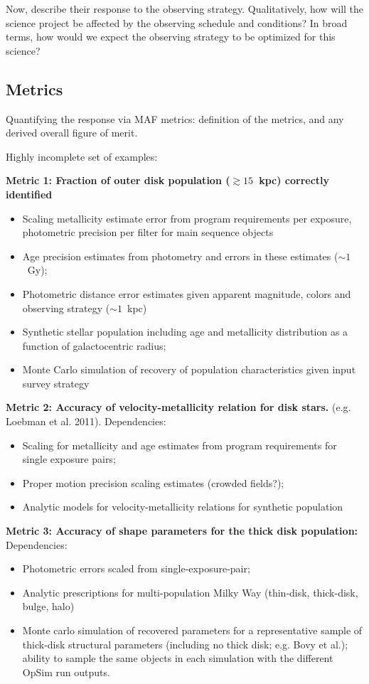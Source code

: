 Now, describe their response to the observing strategy. Qualitatively,
how will the science project be affected by the observing schedule and
conditions? In broad terms, how would we expect the observing strategy
to be optimized for this science?



\subsection{Metrics}
\label{sec:\secname:metrics}

Quantifying the response via MAF metrics: definition of the metrics,
and any derived overall figure of merit.

Highly incomplete set of examples:

{\bf Metric 1: Fraction of outer disk population ($\gtrsim 15$~kpc) correctly identified}
\begin{itemize}
  \item Scaling metallicity estimate error from program requirements per exposure, photometric precision per filter for main sequence objects
    \item Age precision estimates from photometry and errors in these estimates ($\sim 1$~Gy);
      \item Photometric distance error estimates given apparent magnitude, colors and observing strategy ($\sim 1$~kpc)
        \item Synthetic stellar population including age and metallicity distribution as a function of galactocentric radius;
          \item Monte Carlo simulation of recovery of population
            characteristics given input survey strategy
\end{itemize}

{\bf Metric 2: Accuracy of velocity-metallicity relation for disk stars.} (e.g. Loebman et al. 2011). Dependencies:
\begin{itemize}
  \item Scaling for metallicity and age estimates from program requirements for single exposure pairs;
    \item Proper motion precision scaling estimates (crowded fields?); 
  \item Analytic models for velocity-metallicity relations for synthetic population
\end{itemize} 

{\bf Metric 3: Accuracy of shape parameters for the thick disk population:} Dependencies:
\begin{itemize}
  \item Photometric errors scaled from single-exposure-pair;
    \item Analytic prescriptions for multi-population Milky Way (thin-disk, thick-disk, bulge, halo)
      \item Monte carlo simulation of recovered parameters for a representative sample of thick-disk structural parameters (including no thick disk; e.g. Bovy et al.); ability to sample the same objects in each simulation with the different OpSim run outputs. 
\end{itemize}

